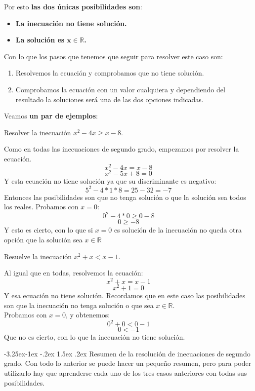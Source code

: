 \documentclass[a4paper,11pt,answers]{exam}
\makeatletter
\newcommand{\realset}{\mathbb{R}}
\renewcommand\paragraph{\@startsection{paragraph}{4}{\z@}%
                                     {-3.25ex\@plus -1ex \@minus -.2ex}%
                                     {1.5ex \@plus .2ex}%
                                     {\normalfont\normalsize\bfseries}}
\makeatother
\begin{document}
Por esto \textbf{las dos únicas posibilidades son}:
\begin{itemize}
\item \textbf{La inecuación no tiene solución.}
\item \textbf{La solución es $\boldsymbol{x \in \realset}$.}
\end{itemize}

Con lo que los pasos que tenemos que seguir para resolver este caso son:
\begin{enumerate}
\item Resolvemos la ecuación y comprobamos que no tiene solución.
\item Comprobamos la ecuación con un valor cualquiera y dependiendo del resultado la soluciones
  será una de las dos opciones indicadas.
\end{enumerate}

Veamos \textbf{un par de ejemplos}:
\begin{questions}
\question Resolver la inecuación $x^2 - 4x \geq x -8$.
  \begin{solution}
    Como en todas las inecuaciones de segundo grado, empezamos por resolver la ecuación.
    \[x^2 - 4x = x - 8\]
    \[x^2- 5x + 8 = 0\]
    Y esta ecuación no tiene solución ya que su discriminante es negativo:
    \[5^2 - 4*1*8 = 25 -32 = -7\]
    Entonces las posibilidades son que no tenga solución o que la solución sea todos los
    reales. Probamos con $x = 0$:
    \[0^2 - 4*0 \geq 0 -8\]
    \[0 \geq -8\]
    Y esto es cierto, con lo que si $x=0$ es solución de la inecuación no queda otra opción que
    la solución sea $x \in \realset$
  \end{solution}
\question Resuelve la inecuación $x^2 + x < x - 1$.
  \begin{solution}
    Al igual que en todas, resolvemos la ecuación:
    \[x^2 + x = x -1\]
    \[x^2+1 = 0\]
    Y esa ecuación no tiene solución. Recordamos que en este caso las posibilidades son que la
    inecuación no tenga solución o que sea $x \in \realset$.\\
    Probamos con $x = 0$, y obtenemos:
    \[0 ^2 + 0 < 0 -1\]
    \[0 < -1\]
    Que no es cierto, con lo que la inecuación no tiene solución.
  \end{solution}
\end{questions}

\paragraph{Resumen de la resolución de inecuaciones de segundo grado.}
Con todo lo anterior se puede hacer un pequeño resumen, pero para poder utilizarlo hay que
aprenderse cada uno de los tres casos anteriores con todas sus posibilidades.\\
\end{document}
